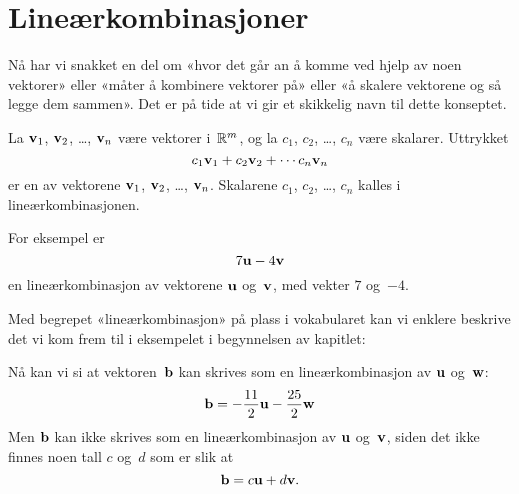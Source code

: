 \section*{Lineærkombinasjoner}

Nå har vi snakket en del om «hvor det går an å komme ved hjelp av noen
vektorer» eller «måter å kombinere vektorer på» eller «å skalere
vektorene og så legge dem sammen».  Det er på tide at vi gir et
skikkelig navn til dette konseptet.

\begin{defn}
La $\mathbf{v}_1$, $\mathbf{v}_2$, \ldots, $\mathbf{v}_n$ være vektorer i~$\mathbb{R}^m$, og la $c_1$,
$c_2$, \ldots, $c_n$ være skalarer.  Uttrykket
\[
c_1 \mathbf{v}_1 + c_2 \mathbf{v}_2 + \cdots c_n \mathbf{v}_n
\]
er en  av vektorene
$\mathbf{v}_1$, $\mathbf{v}_2$, \ldots, $\mathbf{v}_n$.
Skalarene
$c_1$, $c_2$, \ldots, $c_n$
kalles  i lineærkombinasjonen.
\end{defn}


For eksempel er
\[
7 \mathbf{u} - 4 \mathbf{v}
\]
en lineærkombinasjon av vektorene $\mathbf{u}$ og~$\mathbf{v}$, med vekter $7$
og~$-4$.

\smallskip
Med begrepet «lineærkombinasjon» på plass i vokabularet kan vi enklere
beskrive det vi kom frem til i eksempelet i begynnelsen av kapitlet:
\begin{center}
\end{center}
Nå kan vi si at vektoren~$\mathbf{b}$ kan skrives som en lineærkombinasjon av
$\mathbf{u}$ og~$\mathbf{w}$:
\[
\mathbf{b} = -\frac{11}{2} \mathbf{u} - \frac{25}{2} \mathbf{w}
\]
Men $\mathbf{b}$ kan ikke skrives som en lineærkombinasjon av $\mathbf{u}$ og~$\mathbf{v}$,
siden det ikke finnes noen tall $c$ og~$d$ som er slik at
\[
\mathbf{b} = c \mathbf{u} + d \mathbf{v}.
\]


